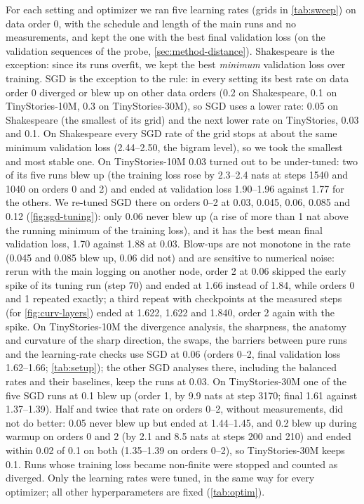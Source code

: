 \documentclass[10pt]{article}
\makeatletter
\renewcommand\paragraph{\@startsection{paragraph}{4}{\z@}{1.2ex \@plus .4ex \@minus .2ex}{-1em}{\normalfont\normalsize\bfseries}}
\makeatother
\begin{document}
\paragraph{Learning rates.} For each setting and optimizer we ran five learning rates (grids in
\cref{tab:sweep}) on data order 0, with the schedule and length of the main runs and no measurements, and
kept the one with the best final validation loss (on the validation sequences of the probe, \cref{sec:method-distance}). Shakespeare is the exception: since its runs overfit, we
kept the best \emph{minimum} validation loss over training. SGD is the exception to the rule: in every
setting its best rate on data order 0 diverged or blew up on other data orders (0.2 on Shakespeare, 0.1 on
TinyStories-10M, 0.3 on TinyStories-30M), so SGD uses a lower rate: 0.05 on Shakespeare (the smallest of its
grid) and the next lower rate on TinyStories, 0.03 and 0.1. On Shakespeare every SGD rate of the grid stops
at about the same minimum validation loss (2.44--2.50, the bigram level), so we took the smallest and most
stable one. On TinyStories-10M 0.03 turned out to be under-tuned: two of its five runs blew up (the training loss
rose by 2.3--2.4 nats at steps 1540 and 1040 on orders 0 and 2) and ended at validation loss 1.90--1.96 against
1.77 for the others. We re-tuned SGD there on orders 0--2 at 0.03, 0.045, 0.06, 0.085 and 0.12 (\cref{fig:sgd-tuning}):
only 0.06 never blew up (a rise of more than 1 nat above the running minimum of the training loss), and it has the
best mean final validation loss, 1.70 against 1.88 at 0.03. Blow-ups are not monotone in the rate (0.045 and 0.085
blew up, 0.06 did not) and are sensitive to numerical noise: rerun with the main logging on another node, order 2
at 0.06 skipped the early spike of its tuning run (step 70) and ended at 1.66 instead of 1.84, while orders 0 and 1
repeated exactly; a third repeat with checkpoints at the measured steps (for \cref{fig:curv-layers}) ended at
1.622, 1.622 and 1.840, order 2 again with the spike. On TinyStories-10M the divergence analysis, the sharpness,
the anatomy and curvature of the sharp direction, the swaps, the barriers between pure runs and the learning-rate
checks use SGD at 0.06 (orders 0--2, final validation loss 1.62--1.66; \cref{tab:setup}); the other SGD analyses
there, including the balanced rates and their baselines, keep the runs at 0.03. On TinyStories-30M one of the five SGD runs at 0.1 blew up (order 1, by 9.9 nats at step 3170; final 1.61
against 1.37--1.39). Half and twice that rate on orders 0--2, without measurements, did not do better: 0.05 never
blew up but ended at 1.44--1.45, and 0.2 blew up during warmup on orders 0 and 2 (by 2.1 and 8.5 nats at steps 200
and 210) and ended within 0.02 of 0.1 on both (1.35--1.39 on orders 0--2), so TinyStories-30M keeps 0.1. Runs whose training loss became non-finite were stopped and counted as diverged. Only the
learning rates were tuned, in the same way for every optimizer; all other hyperparameters are fixed
(\cref{tab:optim}).
\end{document}
